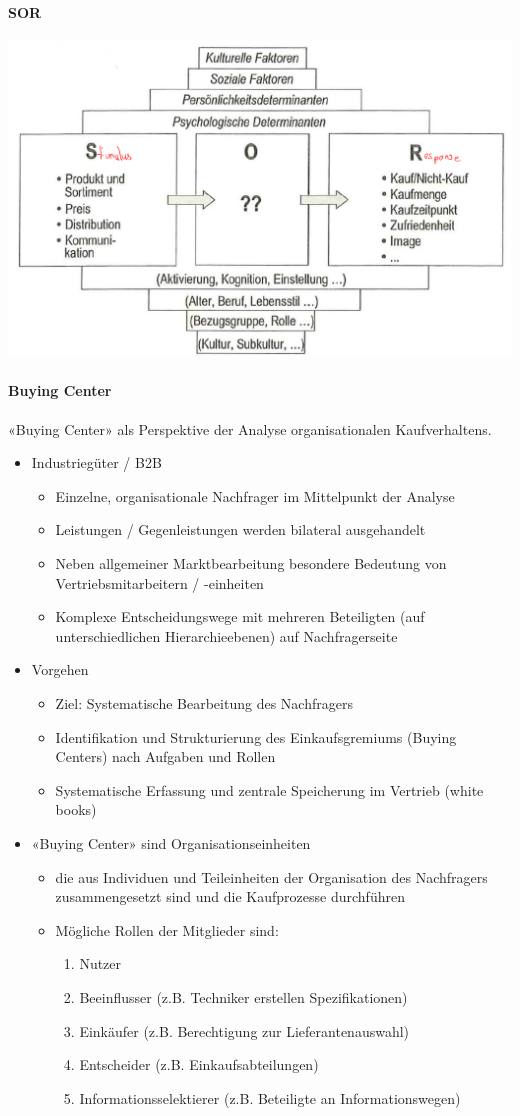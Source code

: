 \paragraph{SOR}
\includegraphics[width=0.4\linewidth]{images/sor}

\paragraph{Buying Center}
«Buying Center» als Perspektive der Analyse organisationalen Kaufverhaltens.
\begin{itemize}
	\item Industriegüter / B2B
	\begin{itemize}
		\item Einzelne, organisationale Nachfrager im Mittelpunkt der Analyse
		\item Leistungen / Gegenleistungen werden bilateral ausgehandelt
		\item Neben allgemeiner Marktbearbeitung besondere Bedeutung von Vertriebsmitarbeitern / -einheiten
		\item Komplexe Entscheidungswege mit mehreren Beteiligten (auf unterschiedlichen Hierarchieebenen) auf Nachfragerseite
	\end{itemize}
	\item Vorgehen
	\begin{itemize}
		\item Ziel: Systematische Bearbeitung des Nachfragers
		\item Identifikation und Strukturierung des Einkaufsgremiums (Buying Centers) nach Aufgaben und Rollen
		\item Systematische Erfassung und zentrale Speicherung im Vertrieb (white books)
	\end{itemize}
	\item «Buying Center» sind Organisationseinheiten
	\begin{itemize}
		\item die aus Individuen und Teileinheiten der Organisation des	Nachfragers zusammengesetzt sind und die Kaufprozesse durchführen
		\item Mögliche Rollen der Mitglieder sind:
		\begin{enumerate}
			\item Nutzer
			\item Beeinflusser (z.B. Techniker erstellen Spezifikationen)
			\item Einkäufer (z.B. Berechtigung zur Lieferantenauswahl)
			\item Entscheider (z.B. Einkaufsabteilungen)
			\item Informationsselektierer (z.B. Beteiligte an Informationswegen)
		\end{enumerate}
	\end{itemize}
\end{itemize}

